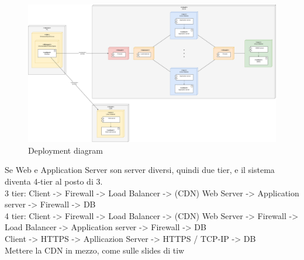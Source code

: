 \begin{figure}[ht]
    \centering
    \includegraphics[width=\textwidth]{images/diagrams/deployment_view.png}
    \caption{Deployment diagram}
    \label{fig:deployment_diagram}
\end{figure}

{\color{red}
    Se Web e Application Server son server diversi, quindi due tier, e il sistema diventa 4-tier al posto di 3. \\
    3 tier: Client -> Firewall -> Load Balancer -> (CDN) Web Server -> Application server -> Firewall -> DB\\
    4 tier: Client -> Firewall -> Load Balancer -> (CDN) Web Server -> Firewall -> Load Balancer -> Application server -> Firewall -> DB\\
            Client -> HTTPS -> Apllicazion Server -> HTTPS / TCP-IP -> DB\\
    Mettere la CDN in mezzo, come sulle slides di tiw
}

